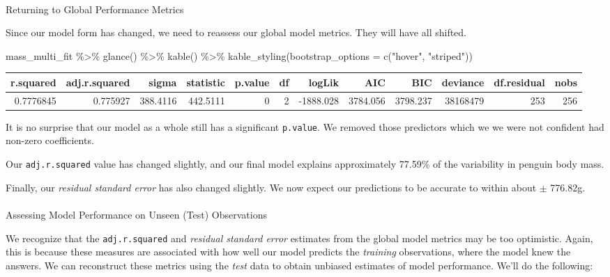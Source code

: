 \documentclass[
  letterpaper,
  DIV=11,
  numbers=noendperiod]{scrartcl}
\makeatletter
\let\oldparagraph\paragraph
\renewcommand{\paragraph}{
    \@ifstar
      \xxxParagraphStar
      \xxxParagraphNoStar
  }
\newcommand{\xxxParagraphStar}[1]{\oldparagraph*{#1}\mbox{}}
\newcommand{\xxxParagraphNoStar}[1]{\oldparagraph{#1}\mbox{}}
\newenvironment{Shaded}{\begin{snugshade}}{\end{snugshade}}
\newcommand{\AttributeTok}[1]{\textcolor[rgb]{0.40,0.45,0.13}{#1}}
\newcommand{\FunctionTok}[1]{\textcolor[rgb]{0.28,0.35,0.67}{#1}}
\newcommand{\NormalTok}[1]{\textcolor[rgb]{0.00,0.23,0.31}{#1}}
\newcommand{\SpecialCharTok}[1]{\textcolor[rgb]{0.37,0.37,0.37}{#1}}
\newcommand{\StringTok}[1]{\textcolor[rgb]{0.13,0.47,0.30}{#1}}
\makeatother
\begin{document}
\paragraph{Returning to Global Performance
Metrics}\label{returning-to-global-performance-metrics}

Since our model form has changed, we need to reassess our global model
metrics. They will have all shifted.

\begin{Shaded}
\begin{Highlighting}[]
\NormalTok{mass\_multi\_fit }\SpecialCharTok{\%\textgreater{}\%}
  \FunctionTok{glance}\NormalTok{() }\SpecialCharTok{\%\textgreater{}\%}
  \FunctionTok{kable}\NormalTok{() }\SpecialCharTok{\%\textgreater{}\%}
  \FunctionTok{kable\_styling}\NormalTok{(}\AttributeTok{bootstrap\_options =} \FunctionTok{c}\NormalTok{(}\StringTok{"hover"}\NormalTok{, }\StringTok{"striped"}\NormalTok{))}
\end{Highlighting}
\end{Shaded}

\begin{longtable}[t]{rrrrrrrrrrrr}
\toprule
r.squared & adj.r.squared & sigma & statistic & p.value & df & logLik & AIC & BIC & deviance & df.residual & nobs\\
\midrule
0.7776845 & 0.775927 & 388.4116 & 442.5111 & 0 & 2 & -1888.028 & 3784.056 & 3798.237 & 38168479 & 253 & 256\\
\bottomrule
\end{longtable}

It is no surprise that our model as a whole still has a significant
\texttt{p.value}. We removed those predictors which we we were not
confident had non-zero coefficients.

Our \texttt{adj.r.squared} value has changed slightly, and our final
model explains approximately 77.59\% of the variability in penguin body
mass.

Finally, our \emph{residual standard error} has also changed slightly.
We now expect our predictions to be accurate to within about \(\pm\)
776.82g.

\paragraph{Assessing Model Performance on Unseen (Test)
Observations}\label{assessing-model-performance-on-unseen-test-observations}

We recognize that the \texttt{adj.r.squared} and \emph{residual standard
error} estimates from the global model metrics may be too optimistic.
Again, this is because these measures are associated with how well our
model predicts the \emph{training} observations, where the model knew
the answers. We can reconstruct these metrics using the \emph{test} data
to obtain unbiased estimates of model performance. We'll do the
following:
\end{document}
